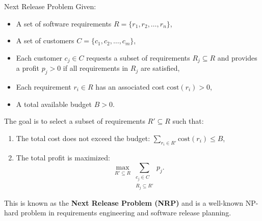 \documentclass{beamer}
\begin{document}
\begin{frame}[t]{Next Release Problem}
    Given:
    \begin{itemize}
      \item A set of software requirements \( R = \{r_1, r_2, \dots, r_n\} \),
      \item A set of customers \( C = \{c_1, c_2, \dots, c_m\} \),
      \item Each customer \( c_j \in C \) requests a subset of requirements \( R_j \subseteq R \) and provides a profit  \( p_j > 0 \) if all requirements in \( R_j \) are satisfied,
      \item Each requirement \( r_i \in R \) has an associated cost \( \text{cost}(r_i) > 0 \),
      \item A total available budget \( B > 0 \).
    \end{itemize}

    The goal is to select a subset of requirements \( R' \subseteq R \) such that:
    \begin{enumerate}
      \item The total cost does not exceed the budget: $\sum_{r_i \in R'} \text{cost}(r_i) \leq B$, 
      \item The total profit is maximized:
      \[
      \max_{R' \subseteq R} \sum_{\substack{c_j \in C \\ R_j \subseteq R'}} p_j.
      \]
    \end{enumerate}

    This is known as the \textbf{Next Release Problem (NRP)} and is a well-known NP-hard problem in requirements engineering and software release planning.
\end{frame}
\end{document}
